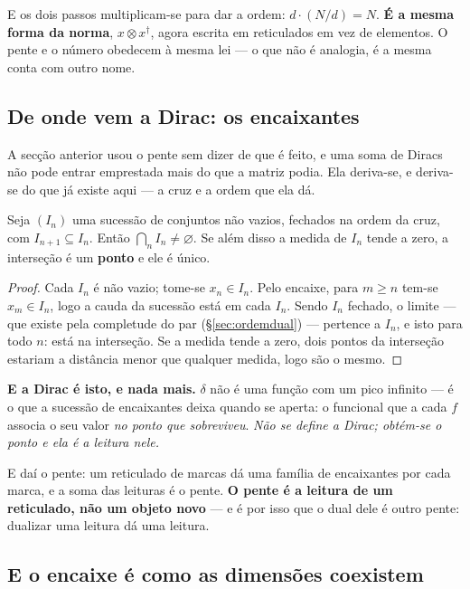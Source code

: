 \documentclass[livro.tex]{subfiles}
\begin{document}
\noindent E os dois passos multiplicam-se para dar a ordem: $d\cdot(N/d)=N$. \textbf{É a mesma
forma da norma}, $x\otimes x^{\dagger}$, agora escrita em reticulados em vez de elementos. O pente
e o número obedecem à mesma lei --- o que não é analogia, é a mesma conta com outro nome.


\subsection{De onde vem a Dirac: os encaixantes}\label{sec:encaixantes}

\noindent A secção anterior usou o pente sem dizer de que é feito, e uma soma de Diracs não pode
entrar emprestada mais do que a matriz podia. Ela deriva-se, e deriva-se do que já existe aqui ---
a cruz e a ordem que ela dá.

\begin{teorema}\label{thm:encaixantes}
Seja $(I_n)$ uma sucessão de conjuntos não vazios, fechados na ordem da cruz, com
$I_{n+1}\subseteq I_n$. Então $\bigcap_n I_n \neq \varnothing$. Se além disso a medida de $I_n$
tende a zero, a interseção é um \textbf{ponto} e ele é único.
\end{teorema}

\begin{proof}
Cada $I_n$ é não vazio; tome-se $x_n\in I_n$. Pelo encaixe, para $m\geq n$ tem-se $x_m\in I_n$,
logo a cauda da sucessão está em cada $I_n$. Sendo $I_n$ fechado, o limite --- que existe pela
completude do par (\S\ref{sec:ordemdual}) --- pertence a $I_n$, e isto para todo $n$: está na
interseção. Se a medida tende a zero, dois pontos da interseção estariam a distância menor que
qualquer medida, logo são o mesmo.
\end{proof}

\noindent \textbf{E a Dirac é isto, e nada mais.} $\delta$ não é uma função com um pico infinito
--- é o que a sucessão de encaixantes deixa quando se aperta: o funcional que a cada $f$ associa o
seu valor \emph{no ponto que sobreviveu}. \emph{Não se define a Dirac; obtém-se o ponto e ela é a
leitura nele.}

\medskip
\noindent E daí o pente: um reticulado de marcas dá uma família de encaixantes por cada marca, e a
soma das leituras é o pente. \textbf{O pente é a leitura de um reticulado, não um objeto novo} ---
e é por isso que o dual dele é outro pente: dualizar uma leitura dá uma leitura.

\subsection{E o encaixe é como as dimensões coexistem}\label{sec:coexistem}
\end{document}
